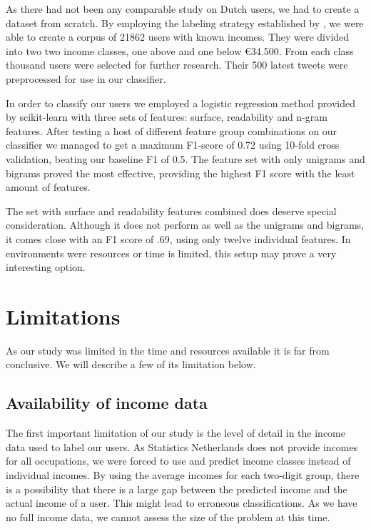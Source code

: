 \documentclass[
10pt, %
a4paper, %
oneside, %
headinclude,footinclude, %
] {book}%
\begin{document}
As there had not been any comparable study on Dutch users, we had to create a dataset from scratch. By employing the labeling strategy established by \citet{sloan}, we were able to create a corpus of 21862 users with known incomes. They were divided into two two income classes, one above and one below \euro 34.500. From each class thousand users were selected for further research. Their 500 latest tweets were preprocessed for use in our classifier.

In order to classify our users we employed a logistic regression method provided by scikit-learn \citep{sklearn} with three sets of features: surface, readability and n-gram features. After testing a host of different feature group combinations on our classifier we managed to get a maximum F1-score of 0.72 using 10-fold cross validation, beating our baseline F1 of 0.5. The feature set with only unigrams and bigrams proved the most effective, providing the highest F1 score with the least amount of features.

The set with surface and readability features combined does deserve special consideration. Although it does not perform as well as the unigrams and bigrams, it comes close with an F1 score of .69, using only twelve individual features. In environments were resources or time is limited, this setup may prove a very interesting option.

\section{Limitations}
As our study was limited in the time and resources available it is far from conclusive. We will describe a few of its limitation below.

\subsection{Availability of income data}
The first important limitation of our study is the level of detail in the income data used to label our users. As Statistics Netherlands does not provide incomes for all occupations, we were forced to use and predict income classes instead of individual incomes. By using the average incomes for each two-digit group, there is a possibility that there is a large gap between the predicted income and the actual income of a user. This might lead to erroneous classifications. As we have no full income data, we cannot assess the size of the problem at this time.
\end{document}
